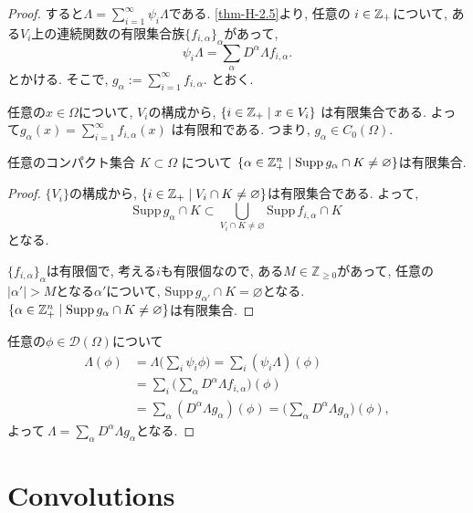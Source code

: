 \begin{proof}
すると\(\Lambda = \sum_{i=1}^\infty \psi_i \Lambda\)である. \ref{thm-H-2.5}より, 任意の \( i \in \mathbb{Z}_+\)について, ある$V_i$上の連続関数の有限集合族\(\{ f_{i,\alpha} \}_\alpha\)があって, 
\[
\psi_i \Lambda = \sum_\alpha D^\alpha \Lambda f_{i,\alpha}.
\]
とかける. そこで, 
\(
g_\alpha := \sum_{i=1}^\infty f_{i,\alpha}.
\)
とおく. 

任意の\( x \in \Omega\)について,  \(V_i\)の構成から, \(\{ i \in \mathbb{Z}_+ \mid x \in V_i  \}\)
は有限集合である. よって\(g_\alpha(x) = \sum_{i=1}^\infty f_{i,\alpha}(x)\) は有限和である. 
つまり, \( g_\alpha \in C_0(\Omega)\).

\begin{tcolorbox}[mybox]
\begin{claim}
任意のコンパクト集合 \(K \subset \Omega\) について
 \(\{ \alpha \in \mathbb{Z}_+^n \mid \mathrm{Supp}\,g_\alpha \cap K \neq \varnothing \}\)は有限集合.
\end{claim}
\end{tcolorbox}
\begin{proof}
 \(\{V_i\}\)の構成から,  \(\{ i \in \mathbb{Z}_+\mid V_i \cap K \neq \varnothing \}\)は有限集合である.
よって, 
\[ \mathrm{Supp}\, g_\alpha \cap K \subset \bigcup_{V_i \cap K \neq \varnothing} \mathrm{Supp}\, f_{i,\alpha} \cap K\]
となる. 

\(\{ f_{i,\alpha} \}_\alpha\)は有限個で, 考える$i$も有限個なので, 
ある\( M \in \mathbb{Z}_{\geq 0}\)があって, 
任意の\(|\alpha'| > M\)となる\(\alpha'\)について,  \(\mathrm{Supp}\, g_{\alpha'} \cap K = \varnothing\)となる. 
\(\{ \alpha \in \mathbb{Z}_+^n \mid \mathrm{Supp}\, g_\alpha \cap K \neq \varnothing \}\)は有限集合. 
\end{proof}


任意の\(\phi \in \mathcal{D}(\Omega)\)について
\begin{align*}
\Lambda(\phi) &= \Lambda\big(\sum_i \psi_i \phi\big) 
= \sum_i (\psi_i \Lambda)(\phi) \\
&= \sum_i \big(\sum_\alpha D^\alpha \Lambda f_{i,\alpha}\big)(\phi) \\
&= \sum_\alpha (D^\alpha \Lambda g_\alpha)(\phi) = \big(\sum_\alpha D^\alpha \Lambda g_\alpha\big)(\phi),
\end{align*}
よって\(\ \Lambda = \sum_\alpha D^\alpha \Lambda g_\alpha\)となる. 
\end{proof}

\section{Convolutions}

